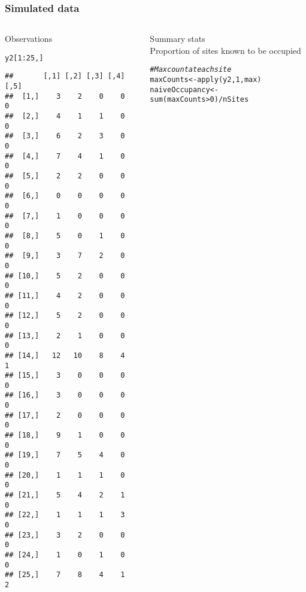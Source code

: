 \documentclass[color=usenames,dvipsnames]{beamer}\usepackage[]{graphicx}\usepackage[]{xcolor}
\makeatletter
\newcommand{\hlnum}[1]{\textcolor[rgb]{0.69,0.494,0}{#1}}%
\newcommand{\hlcom}[1]{\textcolor[rgb]{0.514,0.506,0.514}{\textit{#1}}}%
\newcommand{\hlopt}[1]{\textcolor[rgb]{0,0,0}{#1}}%
\newcommand{\hldef}[1]{\textcolor[rgb]{0,0,0}{#1}}%
\newcommand{\hlkwb}[1]{\textcolor[rgb]{0,0.341,0.682}{#1}}%
\newcommand{\hlkwd}[1]{\textcolor[rgb]{0.004,0.004,0.506}{#1}}%
\newenvironment{kframe}{%
 \def\at@end@of@kframe{}%
 \ifinner\ifhmode%
  \def\at@end@of@kframe{\end{minipage}}%
  \begin{minipage}{\columnwidth}%
 \fi\fi%
 \def\FrameCommand##1{\hskip\@totalleftmargin \hskip-\fboxsep
 \colorbox{shadecolor}{##1}\hskip-\fboxsep
     \hskip-\linewidth \hskip-\@totalleftmargin \hskip\columnwidth}%
 \MakeFramed {\advance\hsize-\width
   \@totalleftmargin\z@ \linewidth\hsize
   \@setminipage}}%
 {\par\unskip\endMakeFramed%
 \at@end@of@kframe}
\newenvironment{knitrout}{}{} %
\makeatother
\begin{document}
\begin{frame}[fragile]
  \frametitle{Simulated data}
  \begin{columns}
    \begin{column}{0.4\textwidth}
      \small
      Observations
  \vspace{-6pt}
\begin{knitrout}\tiny
{}\color{fgcolor}\begin{kframe}
\begin{alltt}
\hldef{y2[}\hlnum{1}\hlopt{:}\hlnum{25}\hldef{,]}
\end{alltt}
\begin{verbatim}
##       [,1] [,2] [,3] [,4] [,5]
##  [1,]    3    2    0    0    0
##  [2,]    4    1    1    0    0
##  [3,]    6    2    3    0    0
##  [4,]    7    4    1    0    0
##  [5,]    2    2    0    0    0
##  [6,]    0    0    0    0    0
##  [7,]    1    0    0    0    0
##  [8,]    5    0    1    0    0
##  [9,]    3    7    2    0    0
## [10,]    5    2    0    0    0
## [11,]    4    2    0    0    0
## [12,]    5    2    0    0    0
## [13,]    2    1    0    0    0
## [14,]   12   10    8    4    1
## [15,]    3    0    0    0    0
## [16,]    3    0    0    0    0
## [17,]    2    0    0    0    0
## [18,]    9    1    0    0    0
## [19,]    7    5    4    0    0
## [20,]    1    1    1    0    0
## [21,]    5    4    2    1    0
## [22,]    1    1    1    3    0
## [23,]    3    2    0    0    0
## [24,]    1    0    1    0    0
## [25,]    7    8    4    1    2
\end{verbatim}
\end{kframe}
\end{knitrout}
  \end{column}
  \begin{column}{0.6\textwidth}
    \pause
    {\centering Summary stats \\}
    \vspace{24pt}
    \small
    Proportion of sites known to be occupied
    \vspace{-6pt}
\begin{knitrout}\scriptsize
{}\color{fgcolor}\begin{kframe}
\begin{alltt}
\hlcom{# Max count at each site}
\hldef{maxCounts} \hlkwb{<-} \hlkwd{apply}\hldef{(y2,} \hlnum{1}\hldef{, max)}
\hldef{naiveOccupancy} \hlkwb{<-} \hlkwd{sum}\hldef{(maxCounts}\hlopt{>}\hlnum{0}\hldef{)}\hlopt{/}\hldef{nSites}

\end{alltt}
\end{kframe}
\end{knitrout}
\end{column}
\end{columns}
\end{frame}
\end{document}
